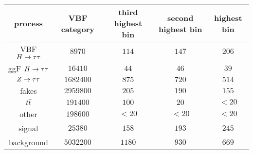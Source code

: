 \begin{tabular}{c|c|c|c|c}
      process        & VBF category & third highest bin & second highest bin & highest bin \\
      \hline \hline
      VBF $H\rightarrow\tau\tau$ &    $8970$ & $114$ &   $147$ & $206$ \\
      ggF $H\rightarrow\tau\tau$ &   $16410$ &  $44$ &    $46$ &  $39$ \\
      \hline
      $Z\rightarrow\tau\tau$     & $1682400$ &  $875$  &  $720$ &   $514$ \\
      fakes          & $2959800$ &  $205$  &  $190$ &   $155$ \\
      $t\bar{t}$       &  $191400$ &  $100$  &   $20$ &  $< 20$ \\
      other          &  $198600$ & $< 20$  & $< 20$ &  $< 20$ \\
      \hline
      signal         &   $25380$ &  $158$  & $193$ & $245$ \\
      background     & $5032200$ & $1180$  & $930$ & $669$ \\
\end{tabular}

